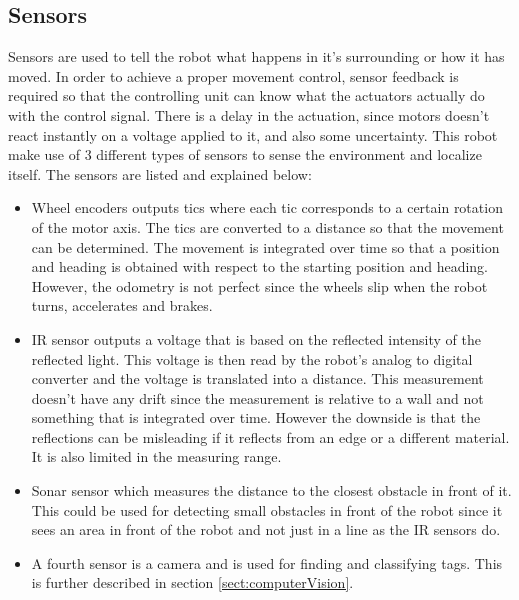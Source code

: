 \subsection{Sensors}

Sensors are used to tell the robot what happens in it's surrounding or how it has moved. 
In order to achieve a proper movement control, sensor feedback is required so that the controlling unit can know what the actuators actually do with the control signal. There is a delay in the actuation, since motors doesn't react instantly on a voltage applied to it, and also some uncertainty. This robot make use of 3 different types of sensors to sense the environment and localize itself. The sensors are listed and explained below:
\begin{itemize}
\item Wheel encoders outputs tics where each tic corresponds to a certain rotation of the motor axis. The tics are converted to a distance so that the movement can be determined. The movement is integrated over time so that a position and heading is obtained with respect to the starting position and heading. However, the odometry is not perfect since the wheels slip when the robot turns, accelerates and brakes. 

\item IR sensor outputs a voltage that is based on the reflected intensity of the reflected light. This voltage is then read by the robot's analog to digital converter and the voltage is translated into a distance. This measurement doesn't have any drift since the measurement is relative to a wall and not something that is integrated over time. However the downside is that the reflections can be misleading if it reflects from an edge or a different material. It is also limited in the measuring range.

\item Sonar sensor which measures the distance to the closest obstacle in front of it. This could be used for detecting small obstacles in front of the robot since it sees an area in front of the robot and not just in a line as the IR sensors do.

\item A fourth sensor is a camera and is used for finding and classifying tags. This is further described in section \ref{sect:computerVision}.

\end{itemize}
